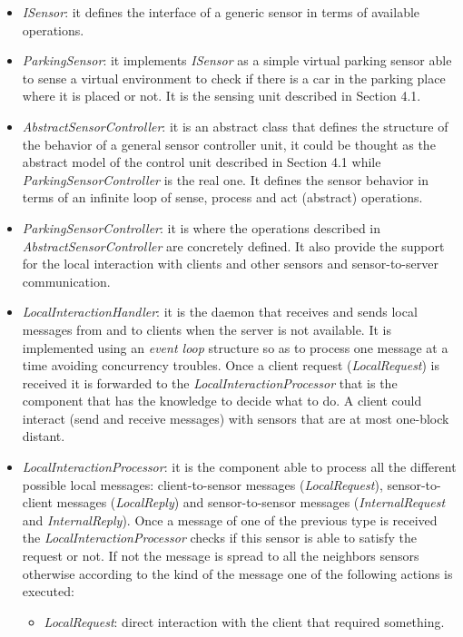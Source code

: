 \documentclass[11pt]{article}
\begin{document}
\begin{itemize}
\item \emph{ISensor}: it defines the interface of a generic sensor in terms of available operations.
\item \emph{ParkingSensor}: it implements \emph{ISensor} as a simple virtual parking sensor able to sense a virtual environment to check if there is a car in the parking place where it is placed or not.  It is the sensing unit described in Section 4.1.
\item \emph{AbstractSensorController}: it is an abstract class that defines the structure of the behavior of a general sensor controller unit, it could be thought as the abstract model of the control unit described in Section 4.1 while \emph{ParkingSensorController} is the real one. It defines the sensor behavior in terms of an infinite loop of sense, process and act (abstract) operations.
\item \emph{ParkingSensorController}: it is where the operations described in \emph{AbstractSensorController} are concretely defined. It also provide the support for the local interaction with clients and other sensors and sensor-to-server communication.
\item \emph{LocalInteractionHandler}: it is the daemon that receives and sends local messages from and to clients when the server is not available. It is implemented using an \emph{event loop} structure so as to process one message at a time avoiding concurrency troubles. Once a client request (\emph{LocalRequest}) is received it is forwarded to the \emph{LocalInteractionProcessor} that is the component that has the knowledge to decide what to do. A client could interact (send and receive messages) with sensors that are at most one-block distant.
\item \emph{LocalInteractionProcessor}: it is the component able to process all the different possible local messages: client-to-sensor messages (\emph{LocalRequest}), sensor-to-client messages (\emph{LocalReply}) and sensor-to-sensor messages (\emph{InternalRequest} and \emph{InternalReply}). Once a message of one of the previous type is received the \emph{LocalInteractionProcessor} checks if this sensor is able to satisfy the request or not. If not the message is spread to all the neighbors sensors otherwise according to the kind of the message one of the following actions is executed:
\begin{itemize}
\item \emph{LocalRequest}: direct interaction with the client that required something.

\end{itemize}
\end{itemize}
\end{document}
